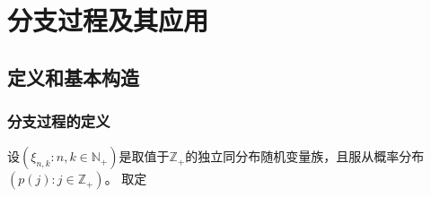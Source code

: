 \documentclass[main]{subfiles}
\begin{document}
\section{分支过程及其应用}%
\subsection{定义和基本构造}
\subsubsection{分支过程的定义}
\begin{definition}\label{def:brunch}
  设\((\xi_{n,k}:n,k \in \mathbb{N}_+)\)是取值于\(\mathbb{Z}_+\)的独立同分布随机变量族，且服从概率分布\((p(j):j \in \mathbb{Z}_+)\)。
  取定
\end{definition}

\ifSubfilesClassLoaded{%
  \printindex}{%
}
\end{document}

